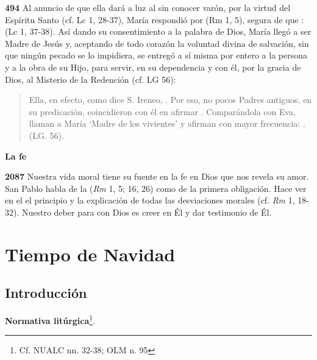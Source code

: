 \begin{body}
\begin{body}
\textbf{}

\textbf{494} Al anuncio de que ella dará a luz al  sin conocer varón, por la virtud del Espíritu Santo (cf. Lc 1, 28-37), María respondió por  (Rm 1, 5), segura de que :  (Lc 1, 37-38). Así dando su consentimiento a la palabra de Dios, María llegó a ser Madre de Jesús y, aceptando de todo corazón la voluntad divina de salvación, sin que ningún pecado se lo impidiera, se entregó a sí misma por entero a la persona y a la obra de su Hijo, para servir, en su dependencia y con él, por la gracia de Dios, al Misterio de la Redención (cf. LG 56):

\begin{quote} Ella, en efecto, como dice S. Ireneo, . Por eso, no pocos Padres antiguos, en su predicación, coincidieron con él en afirmar . Comparándola con Eva, llaman a María `Madre de los vivientes' y afirman con mayor frecuencia: . (LG. 56). \end{quote}

\textbf{La fe}

\textbf{2087} Nuestra vida moral tiene su fuente en la fe en Dios que nos revela su amor. San Pablo habla de la  (\emph{Rm} 1, 5; 16, 26) como de la primera obligación. Hace ver en el  el principio y la explicación de todas las desviaciones morales (cf. \emph{Rm} 1, 18-32). Nuestro deber para con Dios es creer en Él y dar testimonio de Él.


\part{Tiempo de Navidad}

\chapter{Introducción}

\textbf{Normativa litúrgica}\footnote{Cf. NUALC nn. 32-38; OLM n. 95}.


\end{body}
\end{body}
